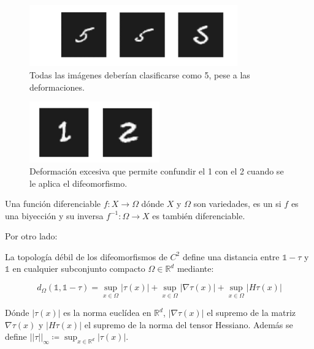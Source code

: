 \begin{figure}[!h]
    \centering
    \includegraphics[width=0.8\textwidth]{img/5_deformado.png}
    \caption{Todas las imágenes deberían clasificarse como 5, pese a las deformaciones.}
    \label{fig:deformaciones_5}
\end{figure}

\begin{figure}[!h]
    \centering
    \includegraphics[width=0.5\textwidth]{img/1_excesivamente_deformado.png}
    \caption{Deformación excesiva que permite confundir el 1 con el 2 cuando se le aplica el difeomorfismo.}
    \label{fig:deformaciones_1}
\end{figure}

\begin{definicion}
    Una función diferenciable $f: X \rightarrow \Omega$ dónde $X$ y $\Omega$ son variedades, es un  si $f$ es una biyección y su inversa $f^{-1}:\Omega \rightarrow X$ es también diferenciable. 
\end{definicion}

\noindent Por otro lado:

\begin{definicion}
    La topología débil de los difeomorfismos de $C^2$ define una distancia entre $\mathbb{1}-\tau$ y $\mathbb{1}$ en cualquier subconjunto compacto $\Omega \in  \mathbb{R}^d$ mediante: 
    
    $$d_\Omega(\mathbb{1},\mathbb{1}-\tau) = \sup_{x \in \Omega} |\tau (x)| + \sup_{x \in \Omega} |\nabla \tau (x)| + \sup_{x \in \Omega}|H \tau (x)|$$
\end{definicion}

\noindent Dónde $|\tau(x)|$ es la norma euclídea en $\mathbb{R}^d$, $|\nabla \tau (x)|$ el supremo de la matriz $\nabla \tau (x)$ y $|H \tau (x)|$ el supremo de la norma del tensor Hessiano. Además se define $||\tau||_{\infty}\coloneqq \sup_{x\in\mathbb{R}^d} |\tau(x)|$.

